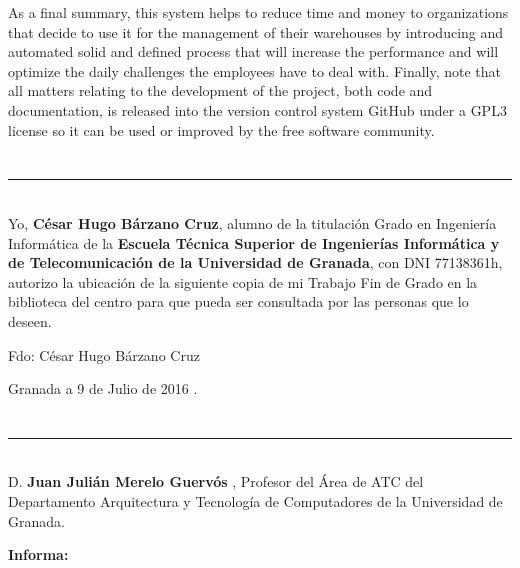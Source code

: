 As a final summary, this system helps to reduce time and money to organizations that decide to use it for the management of their warehouses by introducing and automated solid and defined process that will increase the performance and will optimize the daily challenges the employees have to deal with. Finally, note that all matters relating to the development of the project, both code and documentation, is released into the version control system GitHub under a GPL3 license so it can be used or improved by the free software community. 


\chapter*{}
\thispagestyle{empty}

\noindent\rule[-1ex]{\textwidth}{2pt}\\[4.5ex]

Yo, \textbf{César Hugo Bárzano Cruz}, alumno de la titulación Grado en Ingeniería Informática de la \textbf{Escuela Técnica Superior de Ingenierías Informática y de Telecomunicación de la Universidad de Granada}, con DNI 77138361h, autorizo la ubicación de la siguiente copia de mi Trabajo Fin de Grado en la biblioteca del centro para que pueda ser consultada por las personas que lo deseen.

\vspace{6cm}

\noindent Fdo: César Hugo Bárzano Cruz

\vspace{2cm}

\begin{flushright}
Granada a 9 de Julio de 2016 .
\end{flushright}


\chapter*{}
\thispagestyle{empty}

\noindent\rule[-1ex]{\textwidth}{2pt}\\[4.5ex]

D. \textbf{Juan Julián Merelo Guervós }, Profesor del Área de ATC del Departamento Arquitectura y Tecnología de Computadores de la Universidad de Granada.

\vspace{0.5cm}


\vspace{0.5cm}

\textbf{Informa:}

